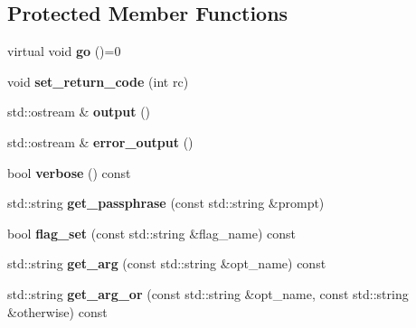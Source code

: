\subsection*{Protected Member Functions}
\begin{DoxyCompactItemize}
\item 
\mbox{\label{class_botan___c_l_i_1_1_command_af35d6a21936f2f9f45d30107652d9bc1}} 
virtual void {\bfseries go} ()=0
\item 
\mbox{\label{class_botan___c_l_i_1_1_command_ab190ad86bd77c14f5ae3756483c58013}} 
void {\bfseries set\+\_\+return\+\_\+code} (int rc)
\item 
\mbox{\label{class_botan___c_l_i_1_1_command_a08e2c724e96deffa395e784bd1811066}} 
std\+::ostream \& {\bfseries output} ()
\item 
\mbox{\label{class_botan___c_l_i_1_1_command_a6f43237c8c5ea6b21eef77a6ec69f03b}} 
std\+::ostream \& {\bfseries error\+\_\+output} ()
\item 
\mbox{\label{class_botan___c_l_i_1_1_command_aca63fd64d22515c2fca6570767df480c}} 
bool {\bfseries verbose} () const
\item 
\mbox{\label{class_botan___c_l_i_1_1_command_a8d8dee73eae5d9771c1a84d2b9b85416}} 
std\+::string {\bfseries get\+\_\+passphrase} (const std\+::string \&prompt)
\item 
\mbox{\label{class_botan___c_l_i_1_1_command_a18ed66e0696c758221830dc40978c677}} 
bool {\bfseries flag\+\_\+set} (const std\+::string \&flag\+\_\+name) const
\item 
\mbox{\label{class_botan___c_l_i_1_1_command_aa50df10864db23655ba5faf61bb3fc82}} 
std\+::string {\bfseries get\+\_\+arg} (const std\+::string \&opt\+\_\+name) const
\item 
\mbox{\label{class_botan___c_l_i_1_1_command_a2786b1d6d97d588cf9b25851178bea00}} 
std\+::string {\bfseries get\+\_\+arg\+\_\+or} (const std\+::string \&opt\+\_\+name, const std\+::string \&otherwise) const

\end{DoxyCompactItemize}
